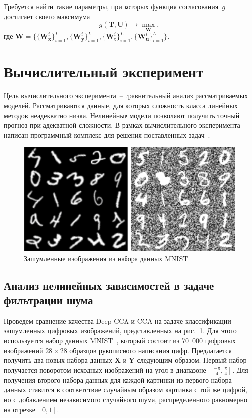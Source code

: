 \documentclass[12pt]{article}
\newcommand{\bx}{\mathbf{x}}
\newcommand{\by}{\mathbf{y}}
\newcommand{\bY}{\mathbf{Y}}
\newcommand{\bX}{\mathbf{X}}
\newcommand{\bu}{\mathbf{u}}
\newcommand{\bt}{\mathbf{t}}
\newcommand{\bT}{\mathbf{T}}
\newcommand{\bU}{\mathbf{U}}
\newcommand{\bW}{\mathbf{W}}
\begin{document}
Требуется найти такие параметры, при которых функция согласования~$g$ достигает своего максимума
\begin{equation}
	g(\bT, \bU) \rightarrow \max_{\bW},
	\label{concordance}
\end{equation}
где $\bW = \bigl\{\{\bW_\bx^i\}_{i=1}^L, \{\bW_\by^i\}_{i=1}^L, \{\bW_\bt^i\}_{i=1}^L, \{\bW_\bu^i\}_{i=1}^L\bigr\}$.

\section{Вычислительный эксперимент}
Цель вычислительного эксперимента~-- сравнительный анализ рассматриваемых моделей.
Рассматриваются данные, для которых сложность класса линейных методов неадекватно низка.
Нелинейные модели позволяют получить точный прогноз при адекватной сложности.
В рамках вычислительного эксперимента написан программный комплекс для решения поставленных задач~\cite{source_code}.

\begin{figure}[!tp]
\centering \includegraphics[width=\linewidth]{figures/noisy_mnist}
\caption{Зашумленные изображения из набора данных MNIST}
\label{fgr:1}
\end{figure}


\subsection{Анализ нелинейных зависимостей в задаче фильтрации шума}

Проведем сравнение качества Deep CCA и CCA на задаче классификации зашумленных цифровых изображений, представленных на рис.~\ref{fgr:1}. Для этого используется набор данных MNIST~\cite{MNIST}, который состоит из 70~000 цифровых изображений $28 \times 28$ образцов рукописного написания цифр. Предлагается получить два новых набора данных $\bX$ и $\bY$ следующим образом. Первый набор получается поворотом исходных изображений на угол в диапазоне $[\frac{-\pi}{4}, \frac{\pi}{4}]$. Для получения второго набора данных для каждой картинки из первого набора данных ставится в соответствие случайным образом картинка с той же цифрой, но с добавлением независимого случайного шума, распределенного равномерно на отрезке $[0,1]$.
\end{document}
